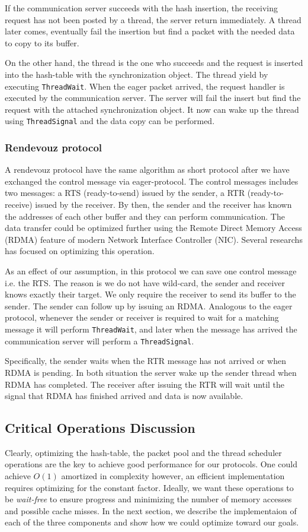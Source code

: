 \documentclass{sig-alternate-05-2015}
\begin{document}
If the communication server succeeds with the hash insertion, the receiving
request has not been posted by a thread, the server return immediately. A
thread later comes, eventually fail the insertion but find a packet
with the needed data to copy to its buffer.

On the other hand, the thread is the one who succeeds and the request is
inserted into the hash-table with the synchronization object. The thread yield
by executing \texttt{ThreadWait}. When the eager packet arrived, the
request handler is executed by the communication server. The server will fail
the insert but find the request with the attached synchronization object. It
now can wake up the thread using \texttt{ThreadSignal} and the data copy can
be performed.

\subsubsection{Rendevouz protocol}
A rendevouz protocol have the same algorithm as short protocol after we have
exchanged the control message via eager-protocol. The control messages 
includes two messages: a RTS (ready-to-send) issued by the sender, a RTR
(ready-to-receive) issued by the receiver. By then, the sender and the receiver
has known the addresses of each other buffer and they can perform
communication.  The data transfer could be optimized further using the
Remote Direct Memory Access (RDMA) feature of modern Network Interface
Controller (NIC).  Several researchs has focused on optimizing this operation.

As an effect of our assumption, in this protocol we can save one control
message i.e. the RTS.  The reason is we do not have wild-card, the sender and
receiver knows exactly their target.  We only require the receiver to send its
buffer to the sender. The sender can follow up by issuing an RDMA.  Analogous
to the eager protocol, whenever the sender or receiver is required to wait for
a matching message it will perform \texttt{ThreadWait}, and later when the
message has arrived the communication server will perform a
\texttt{ThreadSignal}.

Specifically, the sender waits when the RTR message has not arrived or when
RDMA is pending. In both situation the server wake up the sender thread when
RDMA has completed. The receiver after issuing the RTR will wait until the
signal that RDMA has finished arrived and data is now available.

\subsection{Critical Operations Discussion}
Clearly, optimizing the hash-table, the packet pool and the thread scheduler
operations are the key to achieve good performance for our protocols. One could
achieve $O(1)$ amortized in complexity however, an efficient implementation
requires optimizing for the constant factor. Ideally, we want these operations
to be \textit{wait-free} to ensure progress and minimizing the number of memory
accesses and possible cache misses. In the next section, we describe the
implementaion of each of the three components and show how we could optimize
toward our goals.
\end{document}
